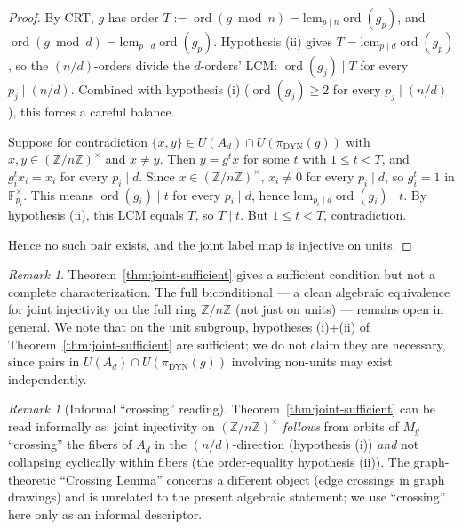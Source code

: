 \documentclass[11pt,reqno]{amsart}
\theoremstyle{plain}
\theoremstyle{definition}
\theoremstyle{remark}
\newtheorem{remark}[theorem]{Remark}
\DeclareMathOperator{\ord}{ord}
\DeclareMathOperator{\dyn}{DYN}
\newcommand{\Z}{\mathbb{Z}}
\newcommand{\F}{\mathbb{F}}
\begin{document}
\begin{proof}
By CRT, $g$ has order $T := \ord(g \bmod n) = \mathrm{lcm}_{p \mid n}
\ord(g_{p})$, and $\ord(g \bmod d) = \mathrm{lcm}_{p \mid d}
\ord(g_{p})$. Hypothesis (ii) gives $T = \mathrm{lcm}_{p \mid d}
\ord(g_{p})$, so the $(n/d)$-orders divide the $d$-orders' LCM:
$\ord(g_{j}) \mid T$ for every $p_{j} \mid (n/d)$. Combined with
hypothesis (i) ($\ord(g_{j}) \ge 2$ for every $p_{j} \mid (n/d)$),
this forces a careful balance.

Suppose for contradiction $\{x, y\} \in U(A_{d}) \cap U(\pi_{\dyn}(g))$
with $x, y \in (\Z/n\Z)^{\times}$ and $x \ne y$. Then $y = g^{t} x$
for some $t$ with $1 \le t < T$, and $g_{i}^{t} x_{i} = x_{i}$ for
every $p_{i} \mid d$. Since $x \in (\Z/n\Z)^{\times}$, $x_{i} \ne 0$
for every $p_{i} \mid d$, so $g_{i}^{t} = 1$ in $\F_{p_{i}}^{\times}$.
This means $\ord(g_{i}) \mid t$ for every $p_{i} \mid d$, hence
$\mathrm{lcm}_{p_{i} \mid d} \ord(g_{i}) \mid t$. By hypothesis (ii),
this LCM equals $T$, so $T \mid t$. But $1 \le t < T$, contradiction.

Hence no such pair exists, and the joint label map is injective on
units.
\end{proof}

\begin{remark}\label{rem:sufficient-not-equiv}
Theorem~\ref{thm:joint-sufficient} gives a sufficient condition but
not a complete characterization. The full biconditional --- a clean
algebraic equivalence for joint injectivity on the full ring
$\Z/n\Z$ (not just on units) --- remains open in general. We note
that on the unit subgroup, hypotheses (i)+(ii) of
Theorem~\ref{thm:joint-sufficient} are sufficient; we do not claim
they are necessary, since pairs in $U(A_{d}) \cap U(\pi_{\dyn}(g))$
involving non-units may exist independently.
\end{remark}

\begin{remark}[Informal ``crossing'' reading]\label{rem:crossing-informal}
Theorem~\ref{thm:joint-sufficient} can be read informally as: joint
injectivity on $(\Z/n\Z)^{\times}$ \emph{follows} from orbits of
$M_{g}$ ``crossing'' the fibers of $A_{d}$ in the $(n/d)$-direction
(hypothesis (i)) \emph{and} not collapsing cyclically within fibers
(the order-equality hypothesis (ii)). The graph-theoretic
``Crossing Lemma'' \cite{ACNS1982} concerns a different object (edge
crossings in graph drawings) and is unrelated to the present
algebraic statement; we use ``crossing'' here only as an informal
descriptor.
\end{remark}
\end{document}
